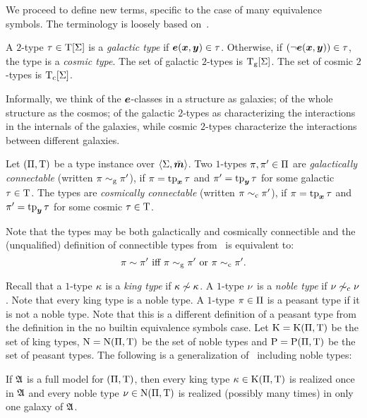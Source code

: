 We proceed to define new terms, specific to the case of many equivalence
symbols.
The terminology is loosely based on~\cite{MALQ:MALQ201400102}.

\begin{definition}
A $2$-type $\tau \in \mathrm{T}[\mathrm{\Sigma}]$ is a \emph{galactic type} if $\bm{e}(\bm{x},\bm{y}) \in
\tau$.
Otherwise, if $(\lnot\bm{e}(\bm{x},\bm{y})) \in \tau$, the type is a \emph{cosmic type}.
The set of galactic $2$-types is $\mathrm{T}_{\mathrm{g}}[\mathrm{\Sigma}]$.
The set of cosmic $2$-types is $\mathrm{T}_{\mathrm{c}}[\mathrm{\Sigma}]$.
\end{definition}
Informally, we think of the $\bm{e}$-classes in a structure as galaxies; of the
whole structure as the cosmos; of the galactic $2$-types as characterizing the
interactions in the internals of the galaxies, while cosmic $2$-types
characterize the interactions between different galaxies.

\begin{definition}
Let $(\Pi,\mathrm{T})$ be a type instance over $\left\langle \mathrm{\Sigma},\bar{\bm{m}} \right\rangle$.
Two $1$-types $\pi, {\pi'} \in \Pi$ are \emph{galactically connectable}
(written $\pi \sim_{\mathrm{g}} {\pi'}$), if $\pi = \operatorname{tp}_{\bm{x}}\tau$ and ${\pi'} = \operatorname{tp}_{\bm{y}}\tau$
for some galactic $\tau \in \mathrm{T}$.
The types are \emph{cosmically connectable} (written $\pi \sim_{\mathrm{c}} {\pi'}$), if
$\pi = \operatorname{tp}_{\bm{x}}\tau$ and ${\pi'} = \operatorname{tp}_{\bm{y}}\tau$ for some cosmic $\tau \in \mathrm{T}$.
\end{definition}

Note that the types may be both galactically and cosmically connectible and the
(unqualified) definition of connectible types from~ is
equivalent to:
\[\pi \sim {\pi'} \text{ iff } \pi \sim_{\mathrm{g}} {\pi'} \text{ or } \pi \sim_{\mathrm{c}}
{\pi'}.\]

Recall that a $1$-type $\kappa$ is a \emph{king type} if $\kappa \not\sim \kappa$.
A $1$-type $\nu$ is a \emph{noble type} if $\nu \not\sim_{\mathrm{c}} \nu$. Note that
every king type is a noble type. A $1$-type $\pi \in \Pi$ is a peasant type
if it is not a noble type.
Note that this is a different definition of a peasant type from the definition in the
no builtin equivalence symbols case.
Let $\mathrm{K} = \mathrm{K}(\Pi,\mathrm{T})$ be the set of king types, $\mathrm{\mathrm{N}} = \mathrm{\mathrm{N}}(\Pi,\mathrm{T})$
be the set of noble types and $\mathrm{P} = \mathrm{P}(\Pi,\mathrm{T})$ be the set of peasant
types. The following is a generalization of~
including noble types:
\begin{remark}\label{rem:twovar-noble-once}
If $\mathfrak{A}$ is a full model for $(\Pi,\mathrm{T})$, then every king type
$\kappa \in \mathrm{K}(\Pi,\mathrm{T})$ is realized once in $\mathfrak{A}$ and every noble type
$\nu \in \mathrm{\mathrm{N}}(\Pi,\mathrm{T})$ is realized (possibly many times) in only one galaxy
of $\mathfrak{A}$.
\end{remark}


